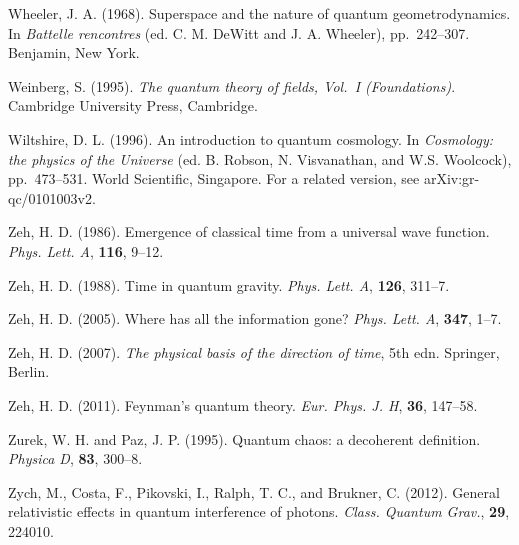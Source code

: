 \documentclass[12pt,a4paper]{article}
\begin{document}
\bibitem{} Wheeler, J. A. (1968). Superspace and the nature of quantum
           geometrodynamics. In {\em Battelle rencontres} (ed. C. M.
           DeWitt and J. A. Wheeler), pp.~242--307. Benjamin, New
           York.

\bibitem{} Weinberg, S. (1995). {\em The quantum theory of fields,
           Vol.~I (Foundations)}. Cambridge University Press, Cambridge.
 
\bibitem{} Wiltshire, D. L. (1996). An introduction to quantum
  cosmology. In {\em Cosmology: the physics of the Universe}
  (ed. B. Robson, N. Visvanathan, and W.S. Woolcock), pp.~473--531.
  World Scientific, Singapore. For a related version, see
  arXiv:\-gr-qc/0101003v2.     

\bibitem{} Zeh, H. D. (1986). Emergence of classical time from a
           universal wave function. {\em Phys. Lett. A}, {\bf 116}, 9--12.  

\bibitem{} Zeh, H. D. (1988). Time in quantum gravity. {\em Phys. Lett. A},
           {\bf 126}, 311--7.

\bibitem{} Zeh, H. D. (2005). Where has all the information gone?
           {\em Phys. Lett. A}, {\bf 347}, 1--7.

\bibitem{} Zeh, H. D. (2007). {\em The physical basis of the direction
           of time}, 5th edn. Springer, Berlin.

\bibitem{} Zeh, H. D. (2011). Feynman's quantum theory.
           {\em Eur. Phys. J. H}, {\bf 36}, 147--58.

\bibitem{} Zurek, W. H. and Paz, J. P. (1995). Quantum chaos: a
  decoherent definition. {\em Physica D}, {\bf 83}, 300--8.

\bibitem{} Zych, M.,  Costa, F.,  Pikovski, I.,  Ralph, T. C., and
  Brukner, C. (2012). General relativistic effects in quantum interference of
photons. {\em Class. Quantum Grav.}, {\bf 29}, 224010.

\endthebibliography

\end{document}
